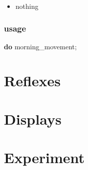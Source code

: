 \documentclass[]{book}
\newenvironment{Shaded}{\begin{snugshade}}{\end{snugshade}}
\newcommand{\KeywordTok}[1]{\textcolor[rgb]{0.13,0.29,0.53}{\textbf{#1}}}
\newcommand{\NormalTok}[1]{#1}
\newcommand{\OtherTok}[1]{\textcolor[rgb]{0.56,0.35,0.01}{#1}}
\providecommand{\tightlist}{%
  \setlength{\itemsep}{0pt}\setlength{\parskip}{0pt}}
\theoremstyle{definition}
\theoremstyle{definition}
\theoremstyle{definition}
\theoremstyle{remark}
\begin{document}
\begin{itemize}
\tightlist
\item
  nothing
\end{itemize}

\hypertarget{usage-2}{%
\subsection*{usage}\label{usage-2}}

\begin{Shaded}
\begin{Highlighting}[]
\KeywordTok{do}\NormalTok{ morning_movement}\OtherTok{;}
\end{Highlighting}
\end{Shaded}

\hypertarget{reflexes}{%
\chapter{Reflexes}\label{reflexes}}

\hypertarget{displays}{%
\chapter{Displays}\label{displays}}

\hypertarget{experiment}{%
\chapter{Experiment}\label{experiment}}

\printindex
\end{document}
